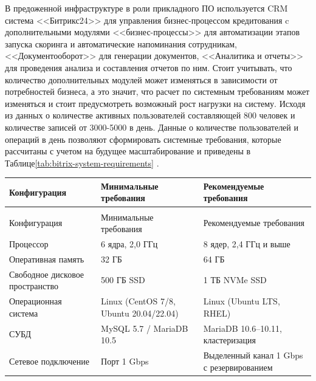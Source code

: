 \documentclass[14pt, a4paper]{extarticle}
\begin{document}
В предоженной инфраструктуре в роли прикладного ПО используется CRM система <<Битрикс24>>
\cite{bitrix24} для управления бизнес-процессом кредитования c дополнительными модулями
<<бизнес-процессы>> для автоматизации этапов запуска скоринга и автоматические напоминания
сотрудникам, <<Документооборот>> для генерации документов, <<Аналитика и отчеты>>
для проведения анализа и составления отчетов по ним. Стоит учитывать, что количество
дополнительных модулей может изменяться в зависимости от потребностей бизнеса, а
это значит, что расчет по системным требованиям может изменяться и стоит предусмотреть возможный
рост нагрузки на систему. Исходя из данных о количестве активных пользователей составляющей
800 человек и количестве записей от 3000-5000 в день. Данные о количестве пользователей
и операций в день позволяют сформировать системные требования, которые рассчитаны с учетом
на будущее масштабирование и приведены в Таблице\;\ref{tab:bitrix-system-requirements} \cite{bitrix24-system-requirements}.


\begin{tabularx}{\textwidth}{|l|X|X|}
  \caption{Системные требования для установки Битрикс24 с модулями CRM \label{tab:bitrix-system-requirements}}         \\
  \hline
  Конфигурация                    & Минимальные требования                 & Рекомендуемые требования                  \\\hline
  \endfirsthead
  \caption*{Продолжение таблицы~\ref{tab:bitrix-system-requirements}}                                                  \\
  \hline
  Конфигурация                    & Минимальные требования                 & Рекомендуемые требования                  \\\hline
  \endhead
  \endfoot
  \endlastfoot

  Процессор                       & 6 ядра, 2{,}0 ГГц                      & 8 ядер, 2{,}4 ГГц и выше                  \\\hline
  Оперативная память              & 32 ГБ                                  & 64 ГБ                                     \\\hline
  Свободное дисковое пространство & 500 ГБ SSD                             & 1 ТБ NVMe SSD                             \\\hline
  Операционная система            & Linux (CentOS 7/8, Ubuntu 20.04/22.04) & Linux (Ubuntu LTS, RHEL)                  \\\hline
  СУБД                            & MySQL 5.7 / MariaDB 10.5               & MariaDB 10.6--10.11, кластеризация        \\\hline
  Сетевое подключение             & Порт 1 Gbps                            & Выделенный канал 1 Gbps с резервированием \\\hline
\end{tabularx}
\end{document}
